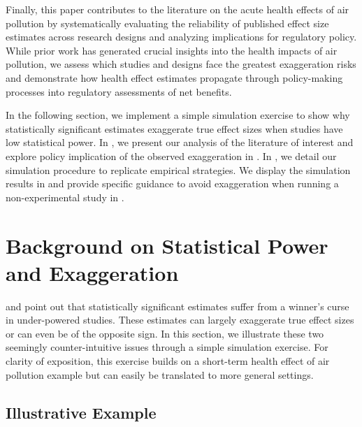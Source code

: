 \documentclass[12pt]{article}
\begin{document}
		 Finally, this paper contributes to the literature on the acute health effects of air pollution by systematically evaluating the reliability of published effect size estimates across research designs and analyzing implications for regulatory policy. While prior work has generated crucial insights into the health impacts of air pollution, we assess which studies and designs face the greatest exaggeration risks and demonstrate how health effect estimates propagate through policy-making processes into regulatory assessments of net benefits.
		 
		 In the following section, we implement a simple simulation exercise to show why statistically significant estimates exaggerate true effect sizes when studies have low statistical power. In , we present our analysis of the literature of interest and explore policy implication of the observed exaggeration in . In , we detail our simulation procedure to replicate empirical strategies. We display the simulation results in  and provide specific guidance to avoid exaggeration when running a non-experimental study in .
    




\section{Background on Statistical Power and Exaggeration}\label{section_mad_scientist}

    \cite{gelman_type_2000} and \cite{gelman_beyond_2014} point out that statistically significant estimates suffer from a winner's curse in under-powered studies. These estimates can largely exaggerate true effect sizes or can even be of the opposite sign. In this section, we illustrate these two seemingly counter-intuitive issues through a simple simulation exercise. For clarity of exposition, this exercise builds on a short-term health effect of air pollution example but can easily be translated to more general settings.

    \subsection{Illustrative Example}
\end{document}
